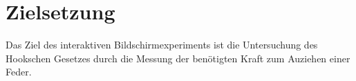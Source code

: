 \section{Zielsetzung}
\label{sec:Zielsetzung}
Das Ziel des interaktiven Bildschirmexperiments ist die Untersuchung des Hookschen Gesetzes durch 
die Messung der benötigten Kraft zum Auziehen einer Feder.